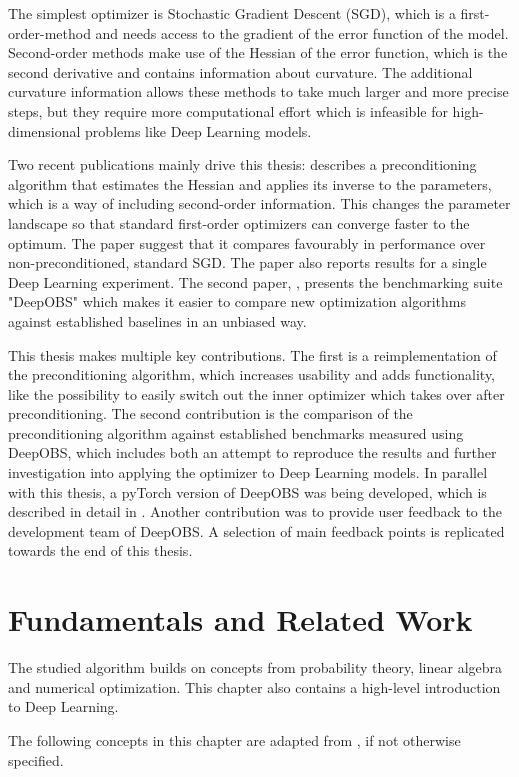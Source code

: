 \documentclass[twoside,12pt,a4paper]{report}
\begin{document}
The simplest optimizer is Stochastic Gradient Descent (SGD), which is a first-order-method and needs access to the gradient of the error function of the model. Second-order methods make use of the Hessian of the error function, which is the second derivative and contains information about curvature. The additional curvature information allows these methods to take much larger and more precise steps, but they require more computational effort which is infeasible for high-dimensional problems like Deep Learning models.

Two recent publications mainly drive this thesis: \cite{roos2019active} describes a preconditioning algorithm that estimates the Hessian and applies its inverse to the parameters, which is a way of including second-order information. This changes the parameter landscape so that standard first-order optimizers can converge faster to the optimum. The paper suggest that it compares favourably in performance over non-preconditioned, standard SGD. The paper also reports results for a single Deep Learning experiment.
The second paper, \cite{deepobs}, presents the benchmarking suite "DeepOBS" which makes it easier to compare new optimization algorithms against established baselines in an unbiased way.

This thesis makes multiple key contributions. The first is a reimplementation of the preconditioning algorithm, which increases usability and adds functionality, like the possibility to easily switch out the inner optimizer which takes over after preconditioning.
The second contribution is the comparison of the preconditioning algorithm against established benchmarks measured using DeepOBS, which includes both an attempt to reproduce the results and further investigation into applying the optimizer to Deep Learning models.
In parallel with this thesis, a pyTorch version of DeepOBS was being developed, which is described in detail in \cite{abahde}. Another contribution was to provide user feedback to the development team of DeepOBS. A selection of main feedback points is replicated towards the end of this thesis.


\chapter{Fundamentals and Related Work}
The studied algorithm builds on concepts from probability theory, linear algebra and numerical optimization. This chapter also contains a high-level introduction to Deep Learning.

The following concepts in this chapter are adapted from \cite{bishop2006pattern}, if not otherwise specified.
\end{document}
